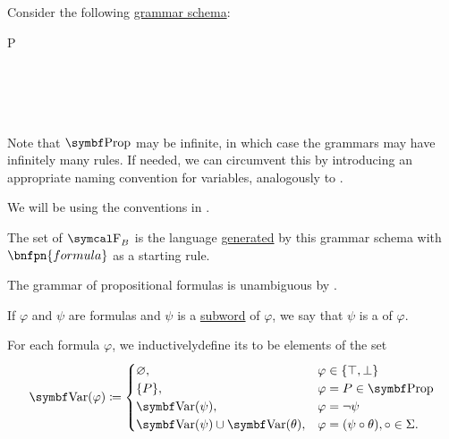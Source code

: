 \begin{definition}\label{def:propositional_language}\mbox{}
  \begin{DefEnum}
     Consider the following \hyperref[def:backus_naur_form]{grammar schema}:
    \begin{bnf*}
         {P \in {}} \\
       {\circ \in \Sigma} \\
          { \bnfor} \\
      \bnfmore             {\bnfts{\( \top \)} \bnfor \bnfts{\( \bot \)} \bnfor} \\
       \\
    \end{bnf*}

    Note that \( \Bold{Prop} \) may be infinite, in which case the grammars may have infinitely many rules. If needed, we can circumvent this by introducing an appropriate naming convention for variables, analogously to .

    We will be using the conventions in .

     The set of  \( \CF_B \) is the language \hyperref[def:grammar_derivation/grammar_language]{generated} by this grammar schema with \( \bnfpn{formula} \) as a starting rule.

    The grammar of propositional formulas is unambiguous by .

     If \( \varphi \) and \( \psi \) are formulas and \( \psi \) is a \hyperref[def:language/subword]{subword} of \( \varphi \), we say that \( \psi \) is a  of \( \varphi \).

     For each formula \( \varphi \), we inductively\IND define its  to be elements of the set
    \begin{equation}\label{def:propositional_language/var}
      \Bold{Var}(\varphi) \coloneqq \begin{cases}
        \varnothing,                              &\varphi \in \{ \top, \bot \}                     \\
        \{ P \},                                  &\varphi = P \in \Bold{Prop}                      \\
        \Bold{Var}(\psi),                         &\varphi = \neg \psi                              \\
        \Bold{Var}(\psi) \cup \Bold{Var}(\theta), &\varphi = (\psi \circ \theta), \circ \in \Sigma.
      \end{cases}
    \end{equation}
  \end{DefEnum}
\end{definition}

